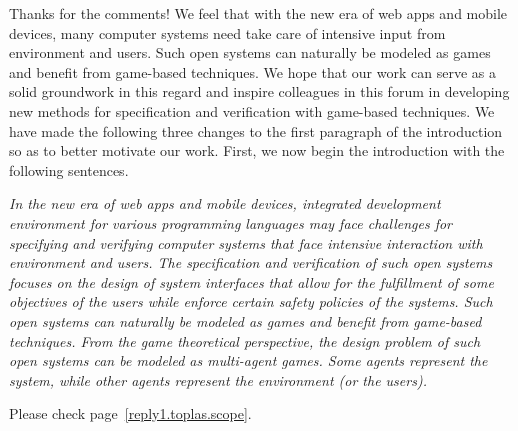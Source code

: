 \documentclass[11pt]{article}
\newcounter{cabbage1}
\newcounter{cabbage2}
\newcounter{cabbage3}
\newcounter{bean1}
\newcounter{bean2}
\newcounter{bean3}
\newcounter{bean4}
\newcounter{bean5}
\newcounter{bean6}
\newenvironment{reply2}{\begin{list}{\bf (Reply 2.\arabic{bean2}):} 
        {\usecounter{bean2}\setcounter{bean2}{\value{cabbage2}} 
        \item \setcounter{cabbage2}{\value{bean2}} 
        }
}{\end{list}}
\begin{document}
\begin{reply2} 
Thanks for the comments!  
We feel that with the new era of web apps and mobile devices, 
many computer systems need take care of intensive input from environment and users.  
Such open systems can naturally be modeled as games and 
benefit from game-based techniques.  
We hope that our work can serve as a solid groundwork 
in this regard and inspire colleagues in this forum in 
developing new methods for specification and verification with game-based 
techniques.  
We have made the following three changes to the first paragraph of the introduction 
so as to better motivate our work. 
First, we now begin the introduction with the following sentences. 
\begin{center} 
\parbox{120mm}{\em  
In the new era of web apps and mobile devices, integrated development 
environment for various programming languages may face challenges for 
specifying and verifying  
computer systems that face intensive interaction with environment and users.  
The specification and verification of such open systems
focuses on the design of system interfaces that allow 
for the fulfillment of some objectives of the users while 
enforce certain safety policies of the systems.
Such open systems can naturally be modeled as games and 
benefit from game-based techniques.  
From the game theoretical perspective, the design problem 
of such open systems can be modeled as multi-agent games.  
Some agents represent the system, while 
other agents represent the environment (or the users).  
} 
\end{center} 
Please check page~\ref{reply1.toplas.scope}.  


\end{reply2}
\end{document}

